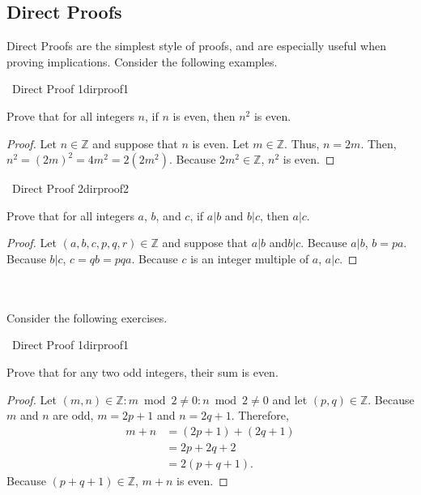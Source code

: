     \pagebreak    
    \subsection{Direct Proofs}
    
        Direct Proofs are the simplest style of proofs, and are especially useful when proving implications. Consider the following examples.
        
        \begin{example}{\Difficulty\,\Difficulty\,\,Direct Proof 1}{dirproof1}
        
        Prove that for all integers \(n\), if \(n\) is even, then \(n^2\) is even.
        
        \begin{proof}
            Let \(n\in\mathbb{Z}\) and suppose that \(n\) is even. Let \(m\in\mathbb{Z}\). Thus, \(n=2m\). Then, \(n^2=(2m)^2=4m^2=2(2m^2)\). Because \(2m^2\in\mathbb{Z}\), \(n^2\) is even.
        \end{proof}
        
        \end{example}
        \begin{example}{\Difficulty\,\Difficulty\,\,Direct Proof 2}{dirproof2}
        
        Prove that for all integers \(a\), \(b\), and \(c\), if \(a|b\) and \(b|c\), then \(a|c\).
        
        \begin{proof}
            Let \((a,b,c,p,q,r)\in\mathbb{Z}\) and suppose that \(a|b\) and\(b|c\). Because \(a|b\), \(b=pa\). Because \(b|c\), \(c=qb=pqa\). Because \(c\) is an integer multiple of \(a\), \(a|c\).
        \end{proof}
        
        \end{example}
        \vphantom
        \\
        \\
        Consider the following exercises.
        \begin{exercise}{\Difficulty\,\Difficulty\,\,Direct Proof 1}{dirproof1}
        
        Prove that for any two odd integers, their sum is even.
        
        \begin{proof}
            Let \((m,n)\in\mathbb{Z}:m\bmod2\neq0:n\bmod2\neq0\) and let \((p,q)\in\mathbb{Z}\). Because \(m\) and \(n\) are odd, \(m=2p+1\) and \(n=2q+1\). Therefore,
            \begin{align*}
                m+n&=(2p+1)+(2q+1) \\
                &=2p+2q+2 \\
                &=2(p+q+1).
            \end{align*}
            Because \((p+q+1)\in\mathbb{Z}\), \(m+n\) is even.
        \end{proof}
        
        \end{exercise}
